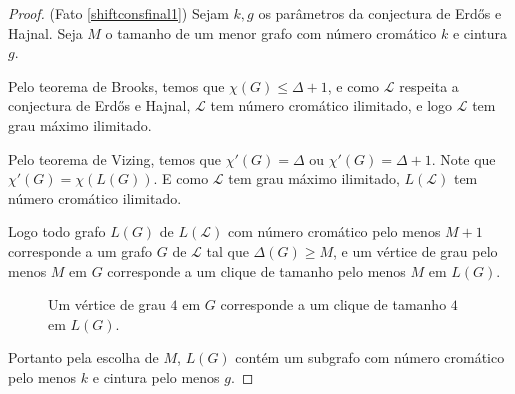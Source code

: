 \begin{proof}(Fato \ref{shiftconsfinal1})
Sejam $k,g$ os parâmetros da conjectura de Erd\H{o}s e Hajnal. Seja $M$ o tamanho de um menor grafo com número cromático $k$ e cintura $g$. 

Pelo teorema de Brooks, temos que $\chi(G) \leq \Delta+1$, e como $\mathcal{L}$ respeita a conjectura de Erd\H{o}s e Hajnal, $\mathcal{L}$ tem número cromático ilimitado, e logo $\mathcal{L}$ tem grau máximo ilimitado.

Pelo teorema de Vizing, temos que $\chi'(G) = \Delta$ ou $\chi'(G) = \Delta+1$. Note que $\chi'(G) = \chi(L(G))$. E como $\mathcal{L}$ tem grau máximo ilimitado, $L(\mathcal{L})$ tem número cromático ilimitado.

Logo todo grafo $L(G)$ de $L(\mathcal{L})$ com número cromático pelo menos $M+1$ corresponde a um grafo $G$ de $\mathcal{L}$ tal que $\Delta(G) \geq M$, e um vértice de grau pelo menos $M$ em $G$ corresponde a um clique de tamanho pelo menos $M$ em $L(G)$.

\begin{figure}[H]
\centering
{}
\caption{Um vértice de grau $4$ em $G$ corresponde a um clique de tamanho $4$ em $L(G)$.}
\label{fig:linegraphclique}
\end{figure}

Portanto pela escolha de $M$, $L(G)$ contém um subgrafo com número cromático pelo menos $k$ e cintura pelo menos $g$.
\end{proof}